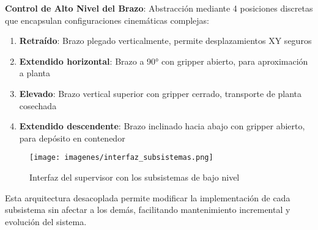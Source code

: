 \textbf{Control de Alto Nivel del Brazo}: Abstracción mediante 4 posiciones discretas que encapsulan configuraciones cinemáticas complejas:
\begin{enumerate}
    \item \textbf{Retraído}: Brazo plegado verticalmente, permite desplazamientos XY seguros
    \item \textbf{Extendido horizontal}: Brazo a 90° con gripper abierto, para aproximación a planta
    \item \textbf{Elevado}: Brazo vertical superior con gripper cerrado, transporte de planta cosechada
    \item \textbf{Extendido descendente}: Brazo inclinado hacia abajo con gripper abierto, para depósito en contenedor
\end{enumerate}

\begin{figure}[H]
    \centering
    \texttt{[image: imagenes/interfaz\_subsistemas.png]}
    \caption{Interfaz del supervisor con los subsistemas de bajo nivel}
    \label{fig:interfaz_subsistemas}
\end{figure}

Esta arquitectura desacoplada permite modificar la implementación de cada subsistema sin afectar a los demás, facilitando mantenimiento incremental y evolución del sistema.
